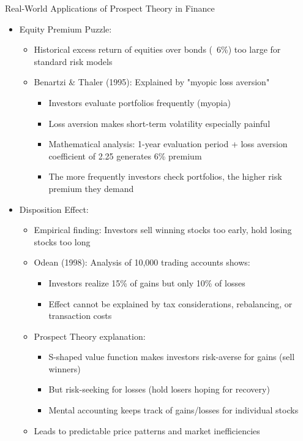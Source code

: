 \documentclass[10pt]{beamer}
\begin{document}
\begin{frame}{Real-World Applications of Prospect Theory in Finance}
  \begin{itemize}[<+->]
    \item Equity Premium Puzzle:
      \begin{itemize}
        \item Historical excess return of equities over bonds (~6\%) too large for standard risk models
        \item Benartzi \& Thaler (1995): Explained by "myopic loss aversion"
          \begin{itemize}
            \item Investors evaluate portfolios frequently (myopia)
            \item Loss aversion makes short-term volatility especially painful
            \item Mathematical analysis: 1-year evaluation period + loss aversion coefficient of 2.25 generates 6\% premium
            \item The more frequently investors check portfolios, the higher risk premium they demand
          \end{itemize}
      \end{itemize}
    \item Disposition Effect:
      \begin{itemize}
        \item Empirical finding: Investors sell winning stocks too early, hold losing stocks too long
        \item Odean (1998): Analysis of 10,000 trading accounts shows:
          \begin{itemize}
            \item Investors realize 15\% of gains but only 10\% of losses
            \item Effect cannot be explained by tax considerations, rebalancing, or transaction costs
          \end{itemize}
        \item Prospect Theory explanation:
          \begin{itemize}
            \item S-shaped value function makes investors risk-averse for gains (sell winners)
            \item But risk-seeking for losses (hold losers hoping for recovery)
            \item Mental accounting keeps track of gains/losses for individual stocks
          \end{itemize}
        \item Leads to predictable price patterns and market inefficiencies
      \end{itemize}
  \end{itemize}
\end{frame}
\end{document}
